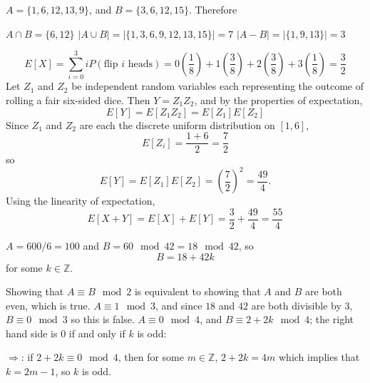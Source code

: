 \documentclass[12pt,twoside]{article}
\begin{document}

\begin{problems}

\problem  $A = \{ 1, 6, 12, 13, 9 \}$, and $B = \{ 3, 6, 12, 15 \}$. Therefore

\begin{problemparts}
\problempart $A \cap B = \{ 6, 12 \}$
\problempart $|A \cup B| = |\{ 1, 3, 6, 9, 12, 13, 15 \}| = 7$
\problempart $|A - B| = |\{ 1, 9, 13 \}| = 3$
\end{problemparts}

\problem  %

\begin{problemparts}
\problempart
$$
E[X] = \sum_{i = 0}^3 iP(\text{flip }i\text{ heads}) = 0\left(\frac{1}{8}\right) + 1\left(\frac{3}{8}\right) + 2\left(\frac{3}{8}\right) + 3\left(\frac{1}{8}\right) = \frac{3}{2}
$$
\problempart Let $Z_1$ and $Z_2$ be independent random variables each representing the outcome of rolling a fair six-sided dice. Then $Y = Z_1Z_2$, and by the properties of expectation,
$$
E[Y] = E[Z_1Z_2] = E[Z_1]E[Z_2]
$$
Since $Z_1$ and $Z_2$ are each the discrete uniform distribution on $[1, 6]$,
$$
E[Z_i] = \frac{1 + 6}{2} = \frac{7}{2}
$$
so
$$
E[Y]= E[Z_1]E[Z_2] = \left(\frac{7}{2}\right)^2 = \frac{49}{4}.
$$
\problempart Using the linearity of expectation,
$$
E[X + Y] = E[X] + E[Y] = \frac{3}{2} + \frac{49}{4} = \frac{55}{4}
$$
\end{problemparts}

\problem $A = 600/6 = 100$ and $B = 60 \mod 42 = 18 \mod 42$, so
$$
B = 18 + 42k
$$
for some $k \in \mathbb{Z}$.

\begin{problemparts}
\problempart Showing that $A \equiv B \mod 2$ is equivalent to showing that $A$ and $B$ are both even, which is true.
\problempart $A \equiv 1 \mod 3$, and since $18$ and $42$ are both divisible by $3$, $B \equiv 0 \mod 3$ so this is false.
\problempart $A \equiv 0 \mod 4$, and $B \equiv 2 + 2k \mod 4$; the right hand side is $0$ if and only if $k$ is odd:

$\Rightarrow$: if $2 + 2k \equiv 0 \mod 4$, then for some $m \in \mathbb{Z}$, $2 + 2k = 4m$ which implies that $k = 2m - 1$, so $k$ is odd.


\end{problemparts}
\end{problems}
\end{document}
